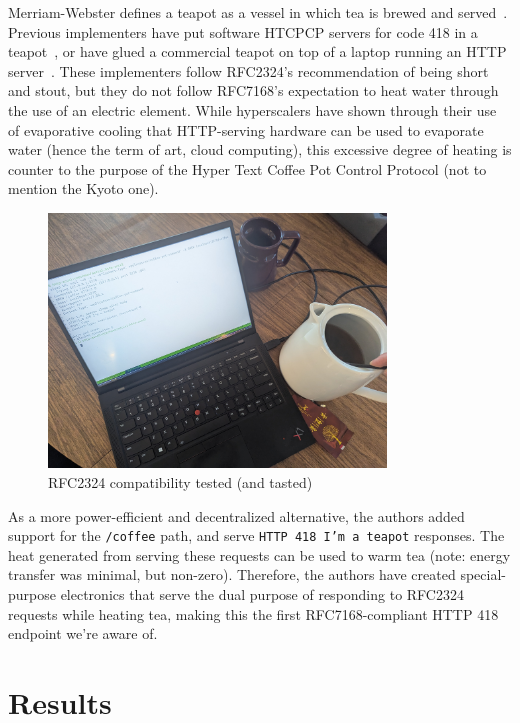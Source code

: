 \documentclass[sigconf,authorversion,nonacm]{acmart}
\begin{document}
Merriam-Webster defines a teapot as a vessel in which tea is brewed and served~\cite{mw:teapot}.
Previous implementers have put software HTCPCP servers for code 418 in a teapot~\cite{error418net}, or have 
glued a commercial teapot on top of a laptop running an HTTP server~\cite{joereddington418}.
These implementers follow RFC2324's recommendation of being short and stout, but they do not follow RFC7168's expectation
to heat water through the use of an electric element.
While hyperscalers have shown through their use of evaporative cooling that HTTP-serving hardware can be used to evaporate water
(hence the term of art, cloud computing), this excessive degree of heating is counter to the purpose of the Hyper 
Text Coffee Pot Control Protocol (not to mention the Kyoto one).


\begin{figure}[htb]
    \includegraphics[width=0.8\textwidth]{images/htcpcp.jpg}
    \caption{RFC2324 compatibility tested (and tasted)}
    \label{fig:htcpcp}
\end{figure}

As a more power-efficient and decentralized alternative, the authors added support for the \texttt{/coffee} path,
and serve \texttt{HTTP 418 I'm a teapot} responses.
The heat generated from serving these requests can be used to warm tea (note: energy transfer was minimal, but non-zero).
Therefore, the authors have created special-purpose electronics that serve the dual purpose of responding to 
RFC2324 requests while heating tea, making this the first RFC7168-compliant HTTP 418 endpoint we're aware of.



\section{Results}
\end{document}
